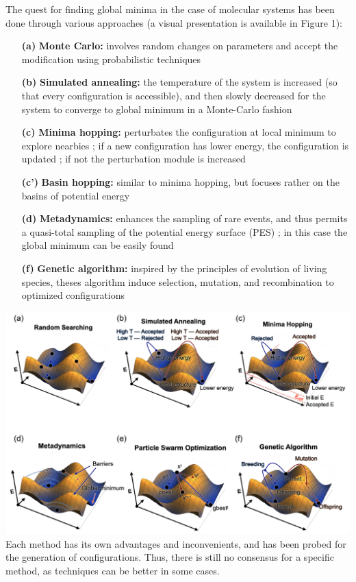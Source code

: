 \documentclass[11pt]{article}
\begin{document}
\begin{multicols}{2}
\noindent The quest for finding global minima in the case of molecular systems has been done through various approaches (a visual presentation is available in Figure 1):
\begin{itemize}
    \itemsep0em
    \item[\textbf{(a)}] \textbf{Monte Carlo:} \small involves random changes on parameters and accept the modification using probabilistic techniques \cite{PhysRevB.95.144104}\normalsize
    \item[\textbf{(b)}] \textbf{Simulated annealing:} \small the temperature of the system is increased (so that every configuration is accessible), and then slowly decreased for the system to converge to global minimum in a Monte-Carlo fashion \cite{B003447I}\normalsize
    \item[\textbf{(c)}] \textbf{Minima hopping:} \small perturbates the configuration at local minimum to explore nearbies ; if a new configuration has lower energy, the configuration is updated ; if not the perturbation module is increased \cite{minima_hopping}\normalsize
    \item[\textbf{(c')}] \textbf{Basin hopping:} \small similar to minima hopping, but focuses rather on the basins of potential energy\normalsize
    \item[\textbf{(d)}] \textbf{Metadynamics:} \small enhances the sampling of rare events, and thus permits a quasi-total sampling of the potential energy surface (PES) ; in this case the global minimum can be easily found \cite{C2CE06642D}\normalsize
    \item[\textbf{(f)}] \textbf{Genetic algorithm:} \small inspired by the principles of evolution of living species, theses algorithm induce selection, mutation, and recombination to optimized configurations \cite{Falls2020}\normalsize
\end{itemize}\normalsize
\bigskip

              \noindent \includegraphics[width=\columnwidth]{figures/optim_figures.png}
                \medskip
\newpage
\normalsize Each method has its own advantages and inconvenients, and has been probed for the generation of configurations. Thus, there is still no consensus for a specific method, as techniques can be better in some cases. \vspace{1em}


\end{multicols}
\end{document}
